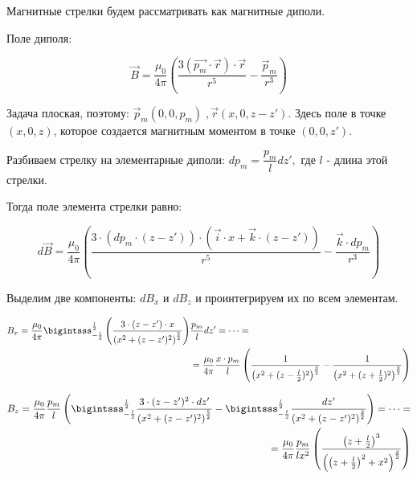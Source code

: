 \documentclass{letask}
\begin{document}
Магнитные стрелки будем рассматривать как магнитные диполи. 

Поле диполя:

$$\vec{B} = \dfrac{\mu_0}{4 \pi} \left(\dfrac{3(\vec{p_m} \cdot\vec{r}) \cdot \vec{r}}{r^5} - \dfrac{\vec p_m}{r^3}\right)$$

Задача плоская, поэтому: $\vec p_m (0, 0, p_m) \; , \vec r (x, 0, z-z')$. Здесь поле в точке $(x, 0, z)$, которое создается магнитным моментом в точке $(0,0,z')$.



Разбиваем стрелку на элементарные диполи: $dp_m = \dfrac{p_m}{l} dz',$ где $l$ - длина этой стрелки.

Тогда поле элемента стрелки равно:

\begin{equation}
d \vec{B} = \dfrac{\mu_0}{4 \pi}
	\left(
		\dfrac{3 \cdot 
			\left(dp_m \cdot (z-z') \right) 
			\cdot 
			\left( \vec{i} \cdot x + \vec{k} \cdot (z-z') \right)
		}{r^5}
	- \dfrac{\vec{k} \cdot dp_m}{r^3} 
	\right)
\end{equation}

Выделим две компоненты: $dB_x$ и $dB_z$ и проинтегрируем их по всем элементам. 

\begin{equation}
\begin{split}
B_x = \dfrac{\mu_0}{4 \pi} \bigintsss_{-\frac{l}{2}}^{\frac{l}{2}}
	\left(
		\dfrac{3 \cdot (z-z') \cdot x}
		{\left(x^2 + (z-z')^2 \right)^{\frac{5}{2}}}
	\right)&
	\dfrac{p_m}{l} dz' =
	\cdots = \\
	& = \dfrac{\mu_0}{4 \pi}
	\dfrac{x \cdot p_m}{l}
	\left(
		\dfrac{1}{\left(x^2 + (z-\frac{l}{2})^2 \right)^{\frac{3}{2}}} - 
		\dfrac{1}{\left(x^2 + (z+\frac{l}{2})^2 \right)^{\frac{3}{2}}} 
	\right)
\end{split}
\end{equation}

\begin{equation}
\begin{split}
B_z = \dfrac{\mu_0}{4 \pi} \dfrac{p_m}{l}
\left(
	\bigintsss_{-\frac{l}{2}}^{\frac{l}{2}}
	\dfrac{3 \cdot (z-z')^2 \cdot dz'}
	{\left(x^2 + (z-z')^2 \right)^{\frac{5}{2}}} - 
	 \bigintsss_{-\frac{l}{2}}^{\frac{l}{2}}
	\dfrac{dz'} 
	{\left(x^2 + (z-z')^2 \right)^{\frac{3}{2}}}
\right) =
	\cdots = \\ 
	  = \dfrac{\mu_0}{4 \pi} \dfrac{p_m}{lx^2}
\left(
	\dfrac{\left(z+\frac{l}{2}\right)^3}
	{\left(\left(z+\frac{l}{2}\right)^2 + x^2 \right)^{\frac{3}{2}}}
\right)
\end{split}
\end{equation}
\end{document}
